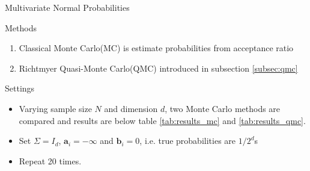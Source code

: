 \begin{frame}{Multivariate Normal Probabilities} 

	\begin{block}{Methods}
		\begin{enumerate}
			\item Classical Monte Carlo(MC) is estimate probabilities from acceptance ratio
			\item Richtmyer Quasi-Monte Carlo(QMC) introduced in subsection \ref{subsec:qmc}
		\end{enumerate}
	\end{block}

	\begin{block}{Settings}
		\begin{itemize}
			\item Varying sample size $N$ and dimension $d$, two Monte Carlo methods are compared and results are below table \ref{tab:results_mc} and \ref{tab:results_qmc}. 
			\item Set $\Sigma = I_d$, $\mathbf{a}_i = -\infty$ and $\mathbf{b}_i = 0$, i.e. true probabilities are $1/2^d$s
			\item Repeat 20 times.
		\end{itemize}
	\end{block}

\end{frame}
	
